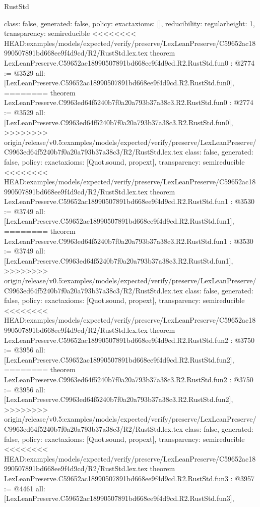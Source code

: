 \begin{lexlean}{RustStd}
\begin{coremodule}
{\begin{coremodule}
{{{  class: false,
  generated: false,
  policy: exact{axioms: []},
  reducibility: regular{height: 1},
  transparency: semireducible
}
<<<<<<<< HEAD:examples/models/expected/verify/preserve/LexLeanPreserve/C59652ac18990507891bd668ee9f4d9cd/R2/RustStd.lex.tex
theorem LexLeanPreserve.C59652ac18990507891bd668ee9f4d9cd.R2.RustStd.fun0 : @2774 := @3529 {
  all: [LexLeanPreserve.C59652ac18990507891bd668ee9f4d9cd.R2.RustStd.fun0],
========
theorem LexLeanPreserve.C9963ed64f5240b7f0a20a793b37a38c3.R2.RustStd.fun0 : @2774 := @3529 {
  all: [LexLeanPreserve.C9963ed64f5240b7f0a20a793b37a38c3.R2.RustStd.fun0],
>>>>>>>> origin/release/v0.5:examples/models/expected/verify/preserve/LexLeanPreserve/C9963ed64f5240b7f0a20a793b37a38c3/R2/RustStd.lex.tex
  class: false,
  generated: false,
  policy: exact{axioms: [Quot.sound, propext]},
  transparency: semireducible
}
<<<<<<<< HEAD:examples/models/expected/verify/preserve/LexLeanPreserve/C59652ac18990507891bd668ee9f4d9cd/R2/RustStd.lex.tex
theorem LexLeanPreserve.C59652ac18990507891bd668ee9f4d9cd.R2.RustStd.fun1 : @3530 := @3749 {
  all: [LexLeanPreserve.C59652ac18990507891bd668ee9f4d9cd.R2.RustStd.fun1],
========
theorem LexLeanPreserve.C9963ed64f5240b7f0a20a793b37a38c3.R2.RustStd.fun1 : @3530 := @3749 {
  all: [LexLeanPreserve.C9963ed64f5240b7f0a20a793b37a38c3.R2.RustStd.fun1],
>>>>>>>> origin/release/v0.5:examples/models/expected/verify/preserve/LexLeanPreserve/C9963ed64f5240b7f0a20a793b37a38c3/R2/RustStd.lex.tex
  class: false,
  generated: false,
  policy: exact{axioms: [Quot.sound, propext]},
  transparency: semireducible
}
<<<<<<<< HEAD:examples/models/expected/verify/preserve/LexLeanPreserve/C59652ac18990507891bd668ee9f4d9cd/R2/RustStd.lex.tex
theorem LexLeanPreserve.C59652ac18990507891bd668ee9f4d9cd.R2.RustStd.fun2 : @3750 := @3956 {
  all: [LexLeanPreserve.C59652ac18990507891bd668ee9f4d9cd.R2.RustStd.fun2],
========
theorem LexLeanPreserve.C9963ed64f5240b7f0a20a793b37a38c3.R2.RustStd.fun2 : @3750 := @3956 {
  all: [LexLeanPreserve.C9963ed64f5240b7f0a20a793b37a38c3.R2.RustStd.fun2],
>>>>>>>> origin/release/v0.5:examples/models/expected/verify/preserve/LexLeanPreserve/C9963ed64f5240b7f0a20a793b37a38c3/R2/RustStd.lex.tex
  class: false,
  generated: false,
  policy: exact{axioms: [Quot.sound, propext]},
  transparency: semireducible
}
<<<<<<<< HEAD:examples/models/expected/verify/preserve/LexLeanPreserve/C59652ac18990507891bd668ee9f4d9cd/R2/RustStd.lex.tex
theorem LexLeanPreserve.C59652ac18990507891bd668ee9f4d9cd.R2.RustStd.fun3 : @3957 := @4461 {
  all: [LexLeanPreserve.C59652ac18990507891bd668ee9f4d9cd.R2.RustStd.fun3],
}}}}}}
\end{coremodule}}
\end{coremodule}
\end{lexlean}
